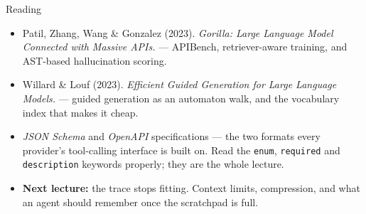 \begin{frame}{Reading}
\begin{itemize}
  \item Patil, Zhang, Wang \& Gonzalez (2023). \textit{Gorilla: Large Language Model Connected with Massive APIs.} --- APIBench, retriever-aware training, and AST-based hallucination scoring.
  \pause
  \item Willard \& Louf (2023). \textit{Efficient Guided Generation for Large Language Models.} --- guided generation as an automaton walk, and the vocabulary index that makes it cheap.
  \pause
  \item \textit{JSON Schema} and \textit{OpenAPI} specifications --- the two formats every provider's tool-calling interface is built on. Read the \texttt{enum}, \texttt{required} and \texttt{description} keywords properly; they are the whole lecture.
  \pause
  \item \textbf{Next lecture:} the trace stops fitting. Context limits, compression, and what an agent should remember once the scratchpad is full.
\end{itemize}
\end{frame}
